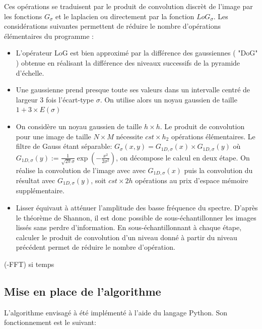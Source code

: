 \documentclass{article}
\begin{document}
	Ces opérations se traduisent par le produit de convolution discrèt de l'image par les fonctions $G_{\sigma}$ et le laplacien ou directement par la fonction ${LoG}_{\sigma}$. Les considérations suivantes permettent de réduire le nombre d'opérations élémentaires du programme : 
	\begin{itemize}
		\item L'opérateur LoG est bien approximé par la différence des gaussiennes ( "DoG" ) obtenue en réalisant la différence des niveaux successifs de la pyramide d'échelle.
		\item Une gaussienne prend presque toute ses valeurs dans un intervalle centré de largeur 3 fois l'écart-type $\sigma$. On utilise alors un noyau gaussien de taille $1 + 3 \times E(\sigma)$
		\item On considère un noyau gaussien de taille $h \times h$. Le produit de convolution pour une image de taille $N \times M$ nécessite $cst \times h_{2}$ opérations élémentaires. Le filtre de Gauss étant séparable: $G_{\sigma}(x,y)=G_{1D, \sigma}(x) \times G_{1D, \sigma}(y)$ o\`{u} $G_{1D, \sigma}(y) := \frac{1}{\sqrt{2\pi}\sigma}\exp(-\frac{x^{2}}{2\sigma^{2}})$, on décompose le calcul en deux étape. On réalise la convolution de l'image avec avec $G_{1D, \sigma}(x)$ puis la convolution du résultat avec $G_{1D, \sigma}(y)$, soit $cst \times 2h$ opérations au prix d'espace mémoire supplémentaire.
		\item Lisser équivaut à atténuer l'amplitude des basse fréquence du spectre. D'après le théorème de Shannon, il est donc possible de sous-échantillonner les images lissés sans perdre d'information. En sous-échantillonnant à chaque étape, calculer le produit de convolution d'un niveau donné à partir du niveau précédent permet de réduire le nombre d'opération.
	\end{itemize}

		(-FFT) si temps

	\subsection{Mise en place de l'algorithme}

	L'algorithme envisagé à été implémenté à l'aide du langage Python. Son fonctionnement est le suivant:
\end{document}
